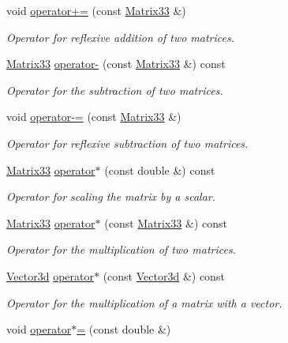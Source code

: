 \begin{DoxyCompactItemize}
void \hyperlink{classMatrix33_acb59e59d3937e075521f478ba83b7165}{operator+=} (const \hyperlink{classMatrix33}{Matrix33} \&)
\begin{DoxyCompactList}\small\item\em Operator for reflexive addition of two matrices. \end{DoxyCompactList}\item 
\hyperlink{classMatrix33}{Matrix33} \hyperlink{classMatrix33_a372f71ec208bb6d3045acd4324b7cb06}{operator-\/} (const \hyperlink{classMatrix33}{Matrix33} \&) const 
\begin{DoxyCompactList}\small\item\em Operator for the subtraction of two matrices. \end{DoxyCompactList}\item 
void \hyperlink{classMatrix33_abc889e10a9c7c532195c7031c1344a74}{operator-\/=} (const \hyperlink{classMatrix33}{Matrix33} \&)
\begin{DoxyCompactList}\small\item\em Operator for reflexive subtraction of two matrices. \end{DoxyCompactList}\item 
\hyperlink{classMatrix33}{Matrix33} \hyperlink{classMatrix33_a6992fd2bb0b6e9ad71b5d3481c4e3e1a}{operator$\ast$} (const double \&) const 
\begin{DoxyCompactList}\small\item\em Operator for scaling the matrix by a scalar. \end{DoxyCompactList}\item 
\hyperlink{classMatrix33}{Matrix33} \hyperlink{classMatrix33_a525f14614255ff81c0cbab8060e8e065}{operator$\ast$} (const \hyperlink{classMatrix33}{Matrix33} \&) const 
\begin{DoxyCompactList}\small\item\em Operator for the multiplication of two matrices. \end{DoxyCompactList}\item 
\hyperlink{classVector3d}{Vector3d} \hyperlink{classMatrix33_a601584a1edbaae7c6a2a2874605d6f61}{operator$\ast$} (const \hyperlink{classVector3d}{Vector3d} \&) const 
\begin{DoxyCompactList}\small\item\em Operator for the multiplication of a matrix with a vector. \end{DoxyCompactList}\item 
void \hyperlink{classMatrix33_a83162791813bef030b1ceb5df3c5cae3}{operator$\ast$=} (const double \&)

\end{DoxyCompactItemize}
